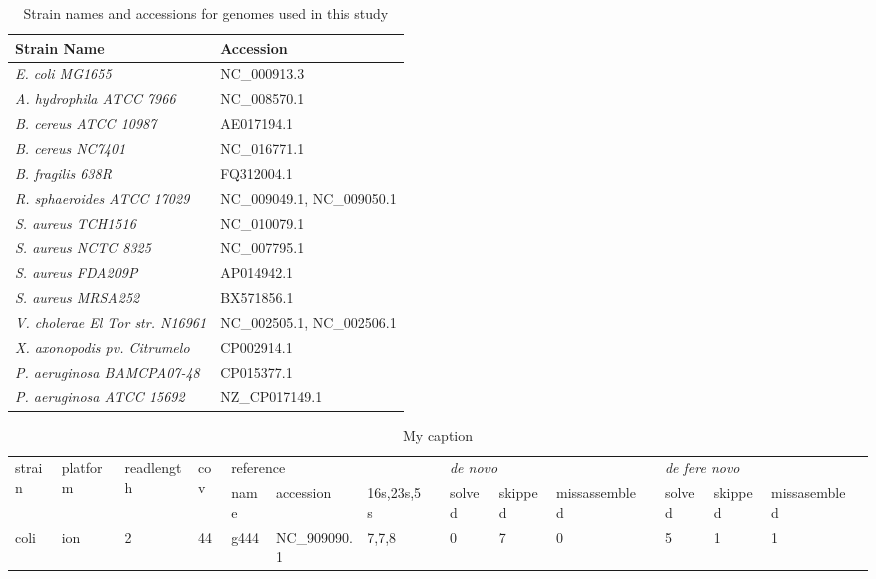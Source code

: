 \documentclass[10pt]{article}
\begin{document}
\begin{table}[]
\centering
\caption{Strain names and accessions for genomes used in this study}
\label{strainlist}
\begin{tabular}{ll}
  Strain Name & Accession \\
  \hline
  \textit{E. coli MG1655} & NC\_000913.3 \\
  \textit{A. hydrophila ATCC 7966} & NC\_008570.1 \\
  \textit{B. cereus ATCC 10987} & AE017194.1 \\
  \textit{B. cereus NC7401} & NC\_016771.1 \\
  \textit{B. fragilis 638R} & FQ312004.1 \\
  \textit{R. sphaeroides ATCC 17029} & NC\_009049.1, NC\_009050.1 \\
  \textit{S. aureus TCH1516} & NC\_010079.1 \\
  \textit{S. aureus NCTC 8325} & NC\_007795.1 \\
  \textit{S. aureus FDA209P} & AP014942.1 \\
  \textit{S. aureus MRSA252} & BX571856.1 \\
  \textit{V. cholerae El Tor str. N16961} & NC\_002505.1, NC\_002506.1 \\
  \textit{X. axonopodis pv. Citrumelo} & CP002914.1 \\
  \textit{P. aeruginosa BAMCPA07-48} & CP015377.1 \\
  \textit{P. aeruginosa ATCC 15692} & NZ\_CP017149.1
\end{tabular}
\end{table}



\begin{table}[]
\centering
\caption{My caption}
\label{my-label}
\begin{tabular}{llllllllllllllll}
  \hline
\multirow{2}{*}{strain} & \multirow{2}{*}{platform} & \multirow{2}{*}{readlength} & \multirow{2}{*}{cov} & \multicolumn{3}{l}{reference} &  & \multicolumn{3}{l}{\textit{de novo}} &  & \multicolumn{3}{l}{\textit{de fere novo}} &  \\ \cline{5-7} \cline{9-11} \cline{13-15}
 &  &  &  & name & accession & 16s,23s,5s &  & solved & skipped & missassembled &  & solved & skipped & missasembled &  \\
  \hline
  coli & ion & 2 & 44 & g444 & NC\_909090.1 & 7,7,8 &  & 0 & 7 & 0 &  & 5 & 1 & 1 &
\end{tabular}
\end{table}
\end{document}
